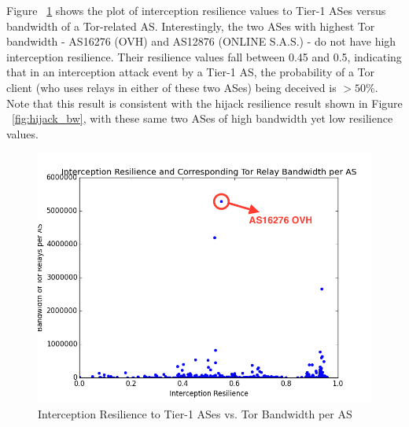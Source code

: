 Figure ~\ref{fig:interception_bw} shows the plot of interception resilience values to Tier-1 ASes versus bandwidth of a Tor-related AS. Interestingly, the two ASes with highest Tor bandwidth - AS16276 (OVH) and AS12876 (ONLINE S.A.S.) - do not have high interception resilience. Their resilience values fall between 0.45 and 0.5, indicating that in an interception attack event by a Tier-1 AS, the probability of a Tor client (who uses relays in either of these two ASes) being deceived is $> 50\%$. Note that this result is consistent with the hijack resilience result shown in Figure ~\ref{fig:hijack_bw}, with these same two ASes of high bandwidth yet low resilience values. 

\begin{figure}[ht!]
\centering
\includegraphics[width=.4\textwidth]{interception_bandwidth}
\caption{Interception Resilience to Tier-1 ASes vs. Tor Bandwidth per AS}
\label{fig:interception_bw}
\end{figure}



